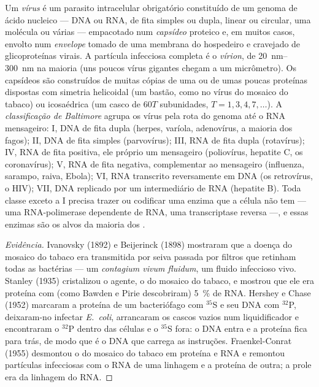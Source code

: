\begin{definition}[Vírus]\label{def:b3:virology:virus}
Um \emph{vírus} é um parasito intracelular obrigatório constituído de
um genoma de ácido nucleico --- DNA ou RNA, de fita simples ou dupla,
linear ou circular, uma molécula ou várias --- empacotado num
\emph{capsídeo} proteico e, em muitos casos, envolto num
\emph{envelope} tomado de uma membrana do hospedeiro e cravejado de
glicoproteínas virais. A partícula infecciosa completa é o
\emph{vírion}, de \qtyrange{20}{300}{nm} na maioria (uns poucos vírus
gigantes chegam a um micrômetro). Os capsídeos são construídos de
muitas cópias de uma ou de umas poucas proteínas dispostas com simetria
helicoidal (um bastão, como no vírus do mosaico do tabaco) ou
icosaédrica (um casco de $60T$ subunidades, $T = 1, 3, 4, 7,\dots$). A
\emph{classificação de Baltimore} agrupa os vírus pela rota do genoma
até o RNA mensageiro: I, DNA de fita dupla (herpes, varíola,
adenovírus, a maioria dos fagos); II, DNA de fita simples
(parvovírus); III, RNA de fita dupla (rotavírus); IV, RNA de fita
positiva, ele próprio um mensageiro (poliovírus, hepatite C, os
coronavírus); V, RNA de fita negativa, complementar ao mensageiro
(influenza, sarampo, raiva, Ebola); VI, RNA transcrito reversamente em
DNA (os retrovírus, o HIV); VII, DNA replicado por um intermediário de
RNA (hepatite B). Toda classe exceto a I precisa trazer ou codificar
uma enzima que a célula não tem --- uma RNA-polimerase dependente de
RNA, uma transcriptase reversa ---, e essas enzimas são os alvos da
maioria dos .
\end{definition}

\begin{proof}[Evidência]
Ivanovsky (1892) e Beijerinck (1898) mostraram que a doença do mosaico
do tabaco era transmitida por seiva passada por filtros que retinham
todas as bactérias --- um \emph{contagium vivum fluidum}, um fluido
infeccioso vivo. Stanley (1935) cristalizou o agente, o  do
mosaico do tabaco, e mostrou que ele era proteína com (como Bawden e
Pirie descobriram) \qty{5}{\%} de RNA. Hershey e Chase (1952) marcaram
a proteína de um bacteriófago com $^{35}$S e seu DNA com $^{32}$P,
deixaram-no infectar \emph{E.~coli}, arrancaram os cascos vazios num
liquidificador e encontraram o $^{32}$P dentro das células e o
$^{35}$S fora: o DNA entra e a proteína fica para trás, de modo que é o
DNA que carrega as instruções. Fraenkel-Conrat (1955) desmontou o
 do mosaico do tabaco em proteína e RNA e remontou partículas
infecciosas com o RNA de uma linhagem e a proteína de outra; a prole era
da linhagem do RNA.
\end{proof}

